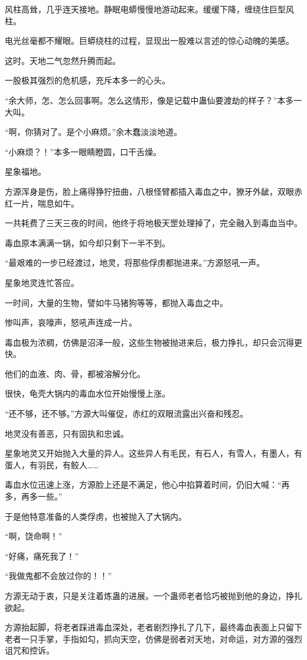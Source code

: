 \begin{this_body}
风柱高耸，几乎连天接地。静眠电蟒慢慢地游动起来。缓缓下降，缠绕住巨型风柱。

电光丝毫都不耀眼。巨蟒绕柱的过程，显现出一股难以言述的惊心动魄的美感。

这时。天地二气忽然升腾而起。

一股极其强烈的危机感，充斥本多一的心头。

“余大师，怎、怎么回事啊。怎么这情形，像是记载中蛊仙要渡劫的样子？”本多一大叫。

“啊，你猜对了。是个小麻烦。”余木蠢淡淡地道。

“小麻烦？！”本多一眼睛瞪圆，口干舌燥。

星象福地。

方源浑身是伤，脸上痛得狰狞扭曲，八根怪臂都插入毒血之中，獠牙外龇，双眼赤红一片，喘息如牛。

一共耗费了三天三夜的时间，他终于将地极天罡处理掉了，完全融入到毒血当中。

毒血原本满满一锅，如今却只剩下一半不到。

“最艰难的一步已经渡过，地灵，将那些俘虏都抛进来。”方源怒吼一声。

星象地灵连忙答应。

一时间，大量的生物，譬如牛马猪狗等等，都抛入毒血之中。

惨叫声，哀嚎声，怒吼声连成一片。

毒血极为浓稠，仿佛是沼泽一般，这些生物被抛进来后，极力挣扎，却只会沉得更快。

他们的血液、肉、骨，都被溶解分化。

很快，龟壳大锅内的毒血水位开始慢慢上涨。

“还不够，还不够。”方源大叫催促，赤红的双眼流露出兴奋和残忍。

地灵没有善恶，只有固执和忠诚。

星象地灵又开始抛入大量的异人。这些异人有毛民，有石人，有雪人，有墨人，有蛋人，有羽民，有鲛人……

毒血水位迅速上涨，方源脸上还是不满足，他心中掐算着时间，仍旧大喊：“再多，再多一些。”

于是他特意准备的人类俘虏，也被抛入了大锅内。

“啊，饶命啊！”

“好痛，痛死我了！”

“我做鬼都不会放过你的！！”

方源无动于衷，只是关注着炼蛊的进展。一个蛊师老者恰巧被抛到他的身边，挣扎欲起。

方源抬起脚，将老者踩进毒血深处，老者剧烈挣扎了几下，最终毒血表面上只留下老者一只手掌，手指如勾，抓向天空，仿佛是弱者对天地，对命运，对方源的强烈诅咒和控诉。


\end{this_body}
